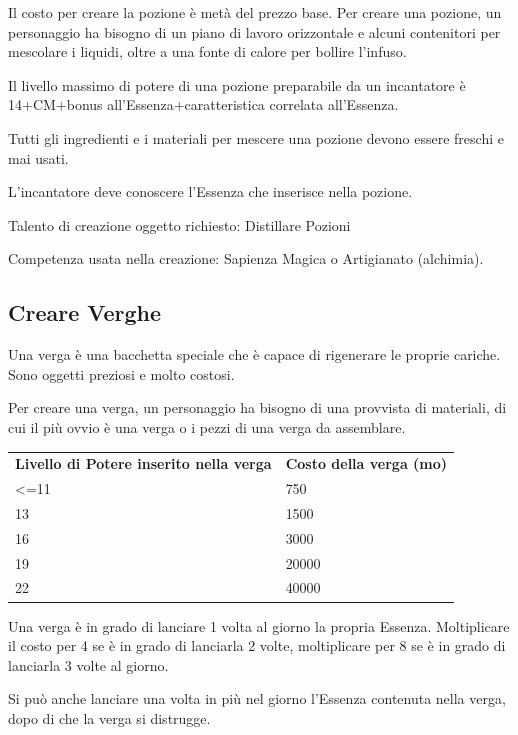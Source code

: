 \documentclass[a4paper,11pt,twoside,openany]{book}
\begin{document}
\bigskip

Il costo per creare la pozione è metà del prezzo base. Per creare una pozione, un personaggio ha bisogno di un piano di lavoro orizzontale e alcuni contenitori per mescolare i liquidi, oltre a una fonte di calore per bollire l'infuso.

Il livello massimo di potere di una pozione preparabile da un incantatore è 14+CM+bonus all'Essenza+caratteristica correlata all'Essenza.

Tutti gli ingredienti e i materiali per mescere una pozione devono essere freschi e mai usati.

L'incantatore deve conoscere l'Essenza che inserisce nella pozione.

Talento di creazione oggetto richiesto: Distillare Pozioni

Competenza usata nella creazione: Sapienza Magica o Artigianato (alchimia).

\subsection{Creare Verghe}

Una verga è una bacchetta speciale che è capace di rigenerare le proprie cariche. Sono oggetti preziosi e molto costosi.

Per creare una verga, un personaggio ha bisogno di una provvista di materiali, di cui il più ovvio è una verga o i pezzi di una verga da assemblare.

\medskip

\begin{tabular}{ll}
	\toprule
	\textbf{Livello di Potere inserito nella verga} & \textbf{Costo della verga (mo)}\\
	\textless=11    & 750\\
	13              & 1500\\
	16              & 3000\\
	19              & 20000\\
	22              & 40000\\
\end{tabular}

\bigskip

Una verga è in grado di lanciare 1 volta al giorno la propria Essenza. Moltiplicare il costo per 4 se è in grado di lanciarla 2 volte, moltiplicare per 8 se è in grado di lanciarla 3 volte al giorno.

Si può anche lanciare una volta in più nel giorno l'Essenza contenuta nella verga, dopo di che la verga si distrugge.
\end{document}
